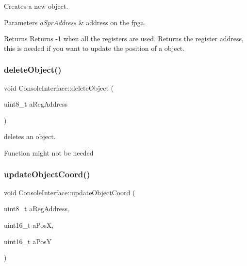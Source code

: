 Creates a new object. 


\begin{DoxyParams}{Parameters}
{\em a\+Spr\+Address} & address on the fpga.\\
\hline
\end{DoxyParams}
\begin{DoxyReturn}{Returns}
Returns -\/1 when all the registers are used. Returns the register address, this is needed if you want to update the position of a object. 
\end{DoxyReturn}
\mbox{\label{class_console_interface_a4d9364dacc2bec064ee84abf374053f4}} 
\subsubsection{\texorpdfstring{deleteObject()}{deleteObject()}}
{\footnotesize\ttfamily void Console\+Interface\+::delete\+Object (\begin{DoxyParamCaption}\item[{uint8\+\_\+t}]{a\+Reg\+Address }\end{DoxyParamCaption})}



deletes an object. 

\begin{DoxyVerb} Function might not be needed
\end{DoxyVerb}
 \mbox{\label{class_console_interface_a5362510f12bf757cc4c388a89b3e0477}} 
\subsubsection{\texorpdfstring{updateObjectCoord()}{updateObjectCoord()}}
{\footnotesize\ttfamily void Console\+Interface\+::update\+Object\+Coord (\begin{DoxyParamCaption}\item[{uint8\+\_\+t}]{a\+Reg\+Address,  }\item[{uint16\+\_\+t}]{a\+PosX,  }\item[{uint16\+\_\+t}]{a\+PosY }\end{DoxyParamCaption})}




